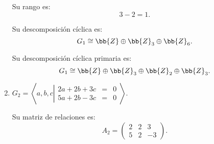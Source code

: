 \begin{ejercicio}
\begin{enumerate}
        Su rango es:
        \begin{equation*}
            3-2= 1.
        \end{equation*}

        Su descomposición cíclica es:
        \begin{equation*}
            G_1 \cong \bb{Z} \oplus \bb{Z}_3 \oplus \bb{Z}_6.
        \end{equation*}

        Su descomposición cíclica primaria es:
        \begin{equation*}
            G_1 \cong \bb{Z} \oplus \bb{Z}_3 \oplus \bb{Z}_2 \oplus \bb{Z}_3.
        \end{equation*}


        \item $G_2 = \left\langle a, b, c \left|
            \begin{array}{rcl}
                2a + 2b + 3c &=& 0 \\
                5a + 2b - 3c &=& 0
            \end{array}
        \right.\right\rangle$.


        Su matriz de relaciones es:
        \begin{equation*}
            A_2 = \begin{pmatrix}
                2 & 2 & 3 \\
                5 & 2 & -3
            \end{pmatrix}.
        \end{equation*}


\end{enumerate}
\end{ejercicio}

